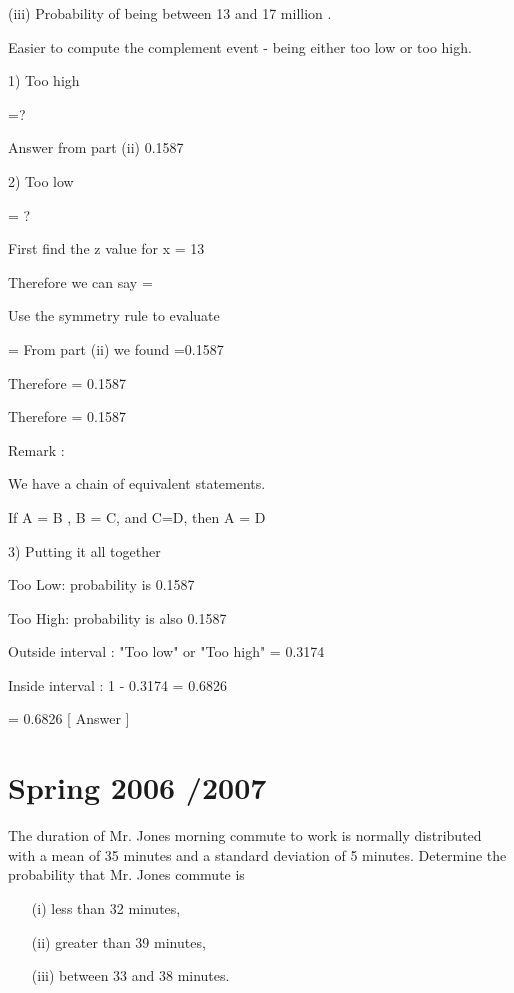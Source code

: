 

(iii)  Probability of being between 13 and 17 million .



Easier to compute the complement event  - being either too low or too high.

1)	 Too high

=? 

Answer from part (ii) 0.1587

2)	Too low

= ?

First find the z value for x = 13



Therefore we can say   =  

Use the symmetry rule to evaluate  

=  
From part (ii) we found   =0.1587

Therefore   = 0.1587

Therefore   = 0.1587

\begin{framed}
	Remark : 
	
	We have a chain of equivalent statements.
	
	If A = B , B = C, and C=D, then A = D 
\end{framed} 


3)	Putting it all together

Too Low: probability is 0.1587

Too High: probability is also 0.1587

Outside interval : "Too low" or "Too high" = 0.3174

Inside interval : 1 - 0.3174 = 0.6826

= 0.6826     [    Answer    ] 


\section{ Spring 2006 /2007 }

The duration of Mr. Jones morning commute to work is normally distributed with a mean of 35 minutes and a standard deviation of 5 minutes. Determine the probability that Mr. Jones commute is

\begin{itemize}
	\item[(i)]    less than 32 minutes,
	\item[(ii)]   greater than 39 minutes,
	\item[(iii)]   between 33 and 38 minutes.
\end{itemize}

